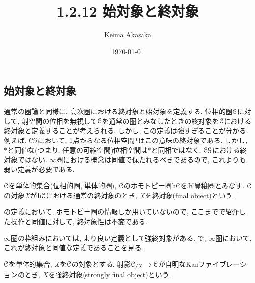 \documentclass[uplatex, a4paper, 14Q, dvipdfmx]{jsreport}
\title{1.2.12 始対象と終対象}
\author{Keima Akasaka}
\date{\today}
\begin{document}

\setcounter{chapter}{1}
\setcounter{section}{2} 
\setcounter{subsection}{11}   
\setcounter{subsubsection}{1}

\subsection{始対象と終対象}

通常の圏論と同様に, 高次圏における終対象と始対象を定義する. 
位相的圏$\mathcal{C}$に対して, 射空間の位相を無視して$\mathcal{C}$を通常の圏とみなしたときの終対象を$\mathcal{C}$における終対象と定義することが考えられる. 
しかし, この定義は強すぎることが分かる. 
例えば, $\mathcal{CG}$において, 1点からなる位相空間$\ast$はこの意味の終対象である.
しかし, $\ast$と同値な(つまり, 任意の可縮空間)位相空間は$\ast$と同相ではなく, $\mathcal{CG}$における終対象ではない. 
$\infty$圏における概念は同値で保たれるべきであるので, これよりも弱い定義が必要である.  

\begin{definition}[終対象] \label{def.1.2.12.1}
  $\mathcal{C}$を単体的集合(位相的圏, 単体的圏), $\mathcal{C}$のホモトピー圏$\mathrm{h}\mathcal{C}$を$\mathcal{H}$豊穣圏とみなす. 
  $\mathcal{C}$の対象$X$が$\mathrm{h}\mathcal{C}$における通常の終対象のとき, $X$を終対象(final object)という. 
\end{definition}

\begin{remark} \label{rem.1.2.12.2}
  の定義において, ホモトピー圏の情報しか用いていないので, ここまでで紹介した操作と同値に対して, 終対象性は不変である. 
\end{remark}

$\infty$圏の枠組みにおいては, より良い定義として強終対象がある. 
で, $\infty$圏において, これが終対象と同値な定義であることを見る. 

\begin{definition}[強終対象] \label{def.1.2.12.3}
  $\mathcal{C}$を単体的集合, $X$を$\mathcal{C}$の対象とする. 
  射影$\mathcal{C}_{/ X} \to \mathcal{C}$が自明なKanファイブレーションのとき, $X$を強終対象(strongly final object)という. 
\end{definition}
\end{document}
